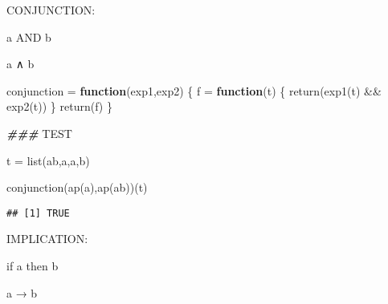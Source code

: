 \documentclass[
]{article}
\newenvironment{Shaded}{\begin{snugshade}}{\end{snugshade}}
\newcommand{\AlertTok}[1]{\textcolor[rgb]{0.94,0.16,0.16}{#1}}
\newcommand{\ControlFlowTok}[1]{\textcolor[rgb]{0.13,0.29,0.53}{\textbf{#1}}}
\newcommand{\DocumentationTok}[1]{\textcolor[rgb]{0.56,0.35,0.01}{\textbf{\textit{#1}}}}
\newcommand{\FunctionTok}[1]{\textcolor[rgb]{0.00,0.00,0.00}{#1}}
\newcommand{\NormalTok}[1]{#1}
\newcommand{\OtherTok}[1]{\textcolor[rgb]{0.56,0.35,0.01}{#1}}
\newcommand{\SpecialCharTok}[1]{\textcolor[rgb]{0.00,0.00,0.00}{#1}}
\newcommand{\StringTok}[1]{\textcolor[rgb]{0.31,0.60,0.02}{#1}}
\begin{document}
CONJUNCTION:

a AND b

a ∧ b

\begin{Shaded}
\begin{Highlighting}[]
\NormalTok{conjunction }\OtherTok{=} \ControlFlowTok{function}\NormalTok{(exp1,exp2)}
\NormalTok{\{}
\NormalTok{  f }\OtherTok{=} \ControlFlowTok{function}\NormalTok{(t)}
\NormalTok{  \{}
    \FunctionTok{return}\NormalTok{(}\FunctionTok{exp1}\NormalTok{(t) }\SpecialCharTok{\&\&} \FunctionTok{exp2}\NormalTok{(t))}
\NormalTok{  \}}
  \FunctionTok{return}\NormalTok{(f)}
\NormalTok{\}}

\DocumentationTok{\#\#\# }\AlertTok{TEST}\DocumentationTok{ }

\NormalTok{t }\OtherTok{=} \FunctionTok{list}\NormalTok{(}\StringTok{\textquotesingle{}ab\textquotesingle{}}\NormalTok{,}\StringTok{\textquotesingle{}a\textquotesingle{}}\NormalTok{,}\StringTok{\textquotesingle{}a\textquotesingle{}}\NormalTok{,}\StringTok{\textquotesingle{}b\textquotesingle{}}\NormalTok{)}

\FunctionTok{conjunction}\NormalTok{(}\FunctionTok{ap}\NormalTok{(}\StringTok{\textquotesingle{}a\textquotesingle{}}\NormalTok{),}\FunctionTok{ap}\NormalTok{(}\StringTok{\textquotesingle{}ab\textquotesingle{}}\NormalTok{))(t)}
\end{Highlighting}
\end{Shaded}

\begin{verbatim}
## [1] TRUE
\end{verbatim}

IMPLICATION:

if a then b

a → b
\end{document}
